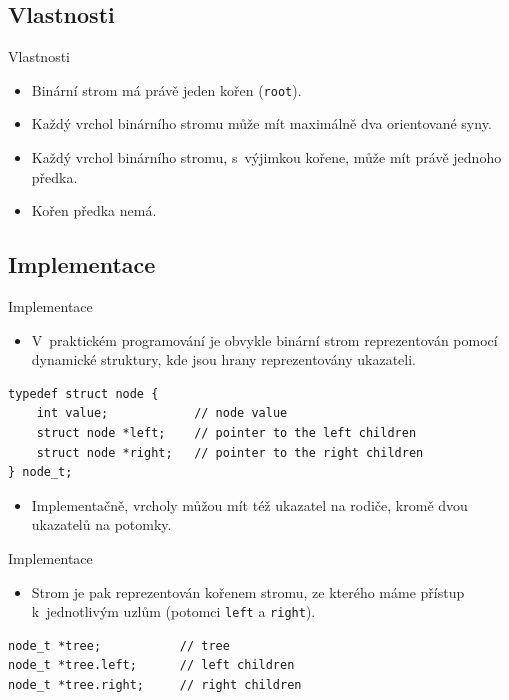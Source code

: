 \documentclass[hyperref={unicode}]{beamer}
\begin{document}
\subsection{Vlastnosti}

\begin{frame}[fragile]{Vlastnosti}
\begin{itemize}
  \item Binární strom má právě jeden kořen (\verb|root|).
  \pause
  \item Každý vrchol binárního stromu může mít maximálně dva orientované syny.
  \pause
  \item Každý vrchol binárního stromu, s~výjimkou kořene, může mít právě jednoho předka.
  \pause
  \item Kořen předka nemá.
\end{itemize}
\end{frame}

\subsection{Implementace}

\begin{frame}[fragile]{Implementace}

\begin{itemize}
    \item V~praktickém programování je obvykle binární strom reprezentován pomocí dynamické struktury,
kde jsou hrany reprezentovány ukazateli.
\end{itemize}

\begin{lstlisting}
typedef struct node {
    int value;            // node value
    struct node *left;    // pointer to the left children
    struct node *right;   // pointer to the right children
} node_t;
\end{lstlisting}

\pause

\begin{itemize}
    \item Implementačně, vrcholy můžou mít též ukazatel na rodiče, kromě dvou ukazatelů na potomky.
\end{itemize}

\end{frame}

\begin{frame}[fragile]{Implementace}

\begin{itemize}
    \item Strom je pak reprezentován kořenem stromu, ze kterého máme
    přístup k~jednotlivým uzlům (potomci \verb|left| a \verb|right|).
\end{itemize}

\vskip 1cm

\begin{lstlisting}
node_t *tree;           // tree
node_t *tree.left;      // left children
node_t *tree.right;     // right children
\end{lstlisting}

\end{frame}
\end{document}
